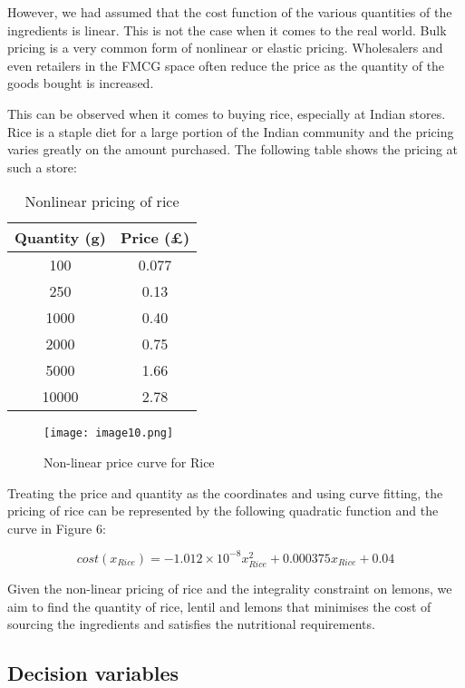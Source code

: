 \documentclass[
]{article}
\begin{document}
However, we had assumed that the cost function of the various quantities of the ingredients is linear. 
This is not the case when it comes to the real world. Bulk pricing is a very common form of nonlinear or elastic pricing.
Wholesalers and even retailers in the FMCG space often reduce the price as the quantity of the goods bought is increased.

This can be observed when it comes to buying rice, especially at Indian stores. Rice is a staple diet for a large portion of the Indian community and the pricing varies greatly on the amount purchased.
The following table shows the pricing at such a store:

\begin{table}[h!]
	\centering
	\begin{tabular}{|c | c |} 
		\hline
		Quantity (g) & Price (\pounds) \\ [0.5ex] 
		\hline\hline
		100          & 0.077           \\
		250          & 0.13            \\
		1000         & 0.40            \\ 
		2000         & 0.75            \\
		5000         & 1.66            \\
		10000        & 2.78            \\
		[1ex] 
		\hline
	\end{tabular}
	\caption{Nonlinear pricing of rice}
	\label{table:2}
\end{table}

\begin{figure}[h]
	\centering
	\texttt{[image: image10.png]}
	\caption{Non-linear price curve for Rice}
\end{figure}

Treating the price and quantity as the coordinates and using curve fitting, the pricing of rice can be represented by the following quadratic function and the curve in Figure 6:

\begin{equation*}
	cost(x_{Rice}) = -1.012 \times 10^{-8} x_{Rice}^2 + 0.000375x_{Rice} + 0.04
\end{equation*}

Given the non-linear pricing of rice and the integrality constraint on lemons, we aim to find the quantity of rice, lentil and lemons that minimises the cost of sourcing the ingredients and satisfies the nutritional requirements.


\hypertarget{decision-variables-2}{%
	\subsection{Decision variables}\label{decision-variables-2}}
\end{document}
